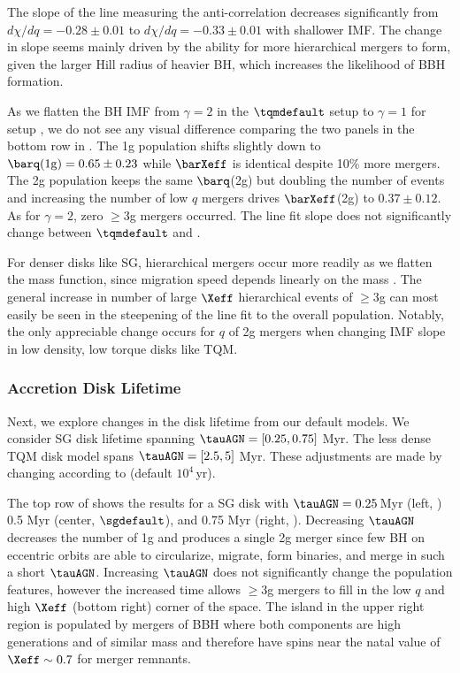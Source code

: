 The slope of the line measuring the anti-correlation decreases significantly from $d\chi/dq=-0.28\pm0.01$ to $d\chi/dq=-0.33\pm0.01$ with shallower IMF.
The change in slope seems mainly driven by the ability for more hierarchical mergers to form, given the larger Hill radius of heavier BH, which increases the likelihood of BBH formation.

As we flatten the BH IMF from $\gamma=2$ in the $\tqmdefault$ setup to $\gamma=1$ for setup , we do not see any visual difference comparing the two panels in the bottom row in .
The 1g population shifts slightly down to $\barq({\rm 1g})=0.65\pm0.23$ while $\barXeff$ is identical despite 10\% more mergers.
The 2g population keeps the same $\barq$(2g) but doubling the number of events and increasing the number of low $q$ mergers drives $\barXeff$(2g) to $0.37\pm0.12$.
As for $\gamma=2$, zero $\geq$3g mergers occurred.
The line fit slope does not significantly change between $\tqmdefault$ and .

For denser disks like SG, hierarchical mergers occur more readily as we flatten the mass function, since migration speed depends linearly on the mass \citep{McKernan+25-mcfactsI}.
The general increase in number of large $\Xeff$ hierarchical events of $\geq$3g can most easily be seen in the steepening of the line fit to the overall population.
Notably, the only appreciable change occurs for $q$ of 2g mergers when changing IMF slope in low density, low torque disks like TQM.


\subsubsection{Accretion Disk Lifetime}
Next, we explore changes in the disk lifetime from our default models.
We consider SG disk lifetime spanning $\tauAGN=[0.25,0.75]$ Myr.
The less dense TQM disk model spans $\tauAGN=[2.5,5]$ Myr.
These adjustments are made by changing  according to  (default $10^4\,$yr).

The top row of  shows the results for a SG disk with $\tauAGN=0.25\,$Myr (left, ) 0.5 Myr (center, $\sgdefault$), and 0.75 Myr (right, ).
Decreasing $\tauAGN$ decreases the number of 1g and produces a single 2g merger since few BH on eccentric orbits are able to circularize, migrate, form binaries, and merge in such a short $\tauAGN$.
Increasing $\tauAGN$ does not significantly change the population features, however the increased time allows $\geq$3g mergers to fill in the low $q$ and high $\Xeff$ (bottom right) corner of the space.
The island in the upper right region is populated by mergers of BBH where both components are high generations and of similar mass and therefore have spins near the natal value of $\Xeff \sim 0.7$ for merger remnants.

